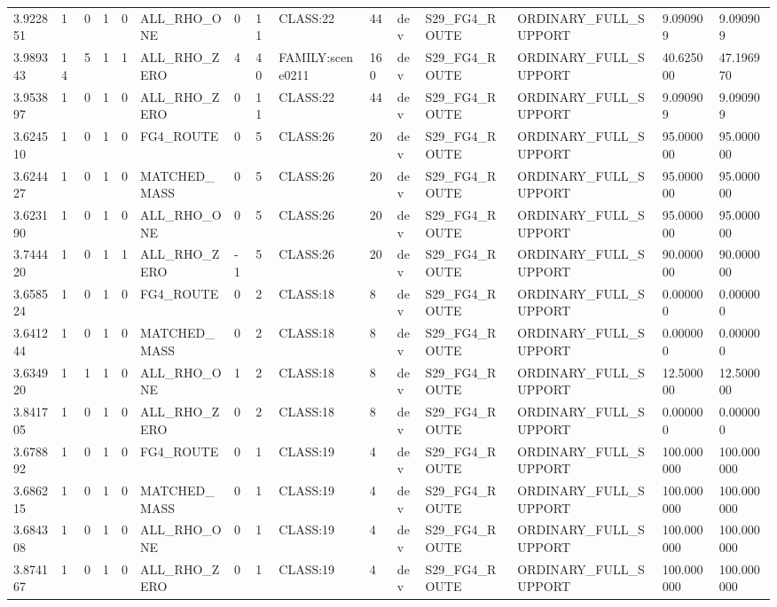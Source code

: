 \begin{tabular}{lllllllllllllll}
3.922851 & 1 & 0 & 1 & 0 & ALL\_RHO\_ONE & 0 & 11 & CLASS:22 & 44 & dev & S29\_FG4\_ROUTE & ORDINARY\_FULL\_SUPPORT & 9.090909 & 9.090909 \\
3.989343 & 14 & 5 & 1 & 1 & ALL\_RHO\_ZERO & 4 & 40 & FAMILY:scene0211 & 160 & dev & S29\_FG4\_ROUTE & ORDINARY\_FULL\_SUPPORT & 40.625000 & 47.196970 \\
3.953897 & 1 & 0 & 1 & 0 & ALL\_RHO\_ZERO & 0 & 11 & CLASS:22 & 44 & dev & S29\_FG4\_ROUTE & ORDINARY\_FULL\_SUPPORT & 9.090909 & 9.090909 \\
3.624510 & 1 & 0 & 1 & 0 & FG4\_ROUTE & 0 & 5 & CLASS:26 & 20 & dev & S29\_FG4\_ROUTE & ORDINARY\_FULL\_SUPPORT & 95.000000 & 95.000000 \\
3.624427 & 1 & 0 & 1 & 0 & MATCHED\_MASS & 0 & 5 & CLASS:26 & 20 & dev & S29\_FG4\_ROUTE & ORDINARY\_FULL\_SUPPORT & 95.000000 & 95.000000 \\
3.623190 & 1 & 0 & 1 & 0 & ALL\_RHO\_ONE & 0 & 5 & CLASS:26 & 20 & dev & S29\_FG4\_ROUTE & ORDINARY\_FULL\_SUPPORT & 95.000000 & 95.000000 \\
3.744420 & 1 & 0 & 1 & 1 & ALL\_RHO\_ZERO & -1 & 5 & CLASS:26 & 20 & dev & S29\_FG4\_ROUTE & ORDINARY\_FULL\_SUPPORT & 90.000000 & 90.000000 \\
3.658524 & 1 & 0 & 1 & 0 & FG4\_ROUTE & 0 & 2 & CLASS:18 & 8 & dev & S29\_FG4\_ROUTE & ORDINARY\_FULL\_SUPPORT & 0.000000 & 0.000000 \\
3.641244 & 1 & 0 & 1 & 0 & MATCHED\_MASS & 0 & 2 & CLASS:18 & 8 & dev & S29\_FG4\_ROUTE & ORDINARY\_FULL\_SUPPORT & 0.000000 & 0.000000 \\
3.634920 & 1 & 1 & 1 & 0 & ALL\_RHO\_ONE & 1 & 2 & CLASS:18 & 8 & dev & S29\_FG4\_ROUTE & ORDINARY\_FULL\_SUPPORT & 12.500000 & 12.500000 \\
3.841705 & 1 & 0 & 1 & 0 & ALL\_RHO\_ZERO & 0 & 2 & CLASS:18 & 8 & dev & S29\_FG4\_ROUTE & ORDINARY\_FULL\_SUPPORT & 0.000000 & 0.000000 \\
3.678892 & 1 & 0 & 1 & 0 & FG4\_ROUTE & 0 & 1 & CLASS:19 & 4 & dev & S29\_FG4\_ROUTE & ORDINARY\_FULL\_SUPPORT & 100.000000 & 100.000000 \\
3.686215 & 1 & 0 & 1 & 0 & MATCHED\_MASS & 0 & 1 & CLASS:19 & 4 & dev & S29\_FG4\_ROUTE & ORDINARY\_FULL\_SUPPORT & 100.000000 & 100.000000 \\
3.684308 & 1 & 0 & 1 & 0 & ALL\_RHO\_ONE & 0 & 1 & CLASS:19 & 4 & dev & S29\_FG4\_ROUTE & ORDINARY\_FULL\_SUPPORT & 100.000000 & 100.000000 \\
3.874167 & 1 & 0 & 1 & 0 & ALL\_RHO\_ZERO & 0 & 1 & CLASS:19 & 4 & dev & S29\_FG4\_ROUTE & ORDINARY\_FULL\_SUPPORT & 100.000000 & 100.000000 \\

\end{tabular}
